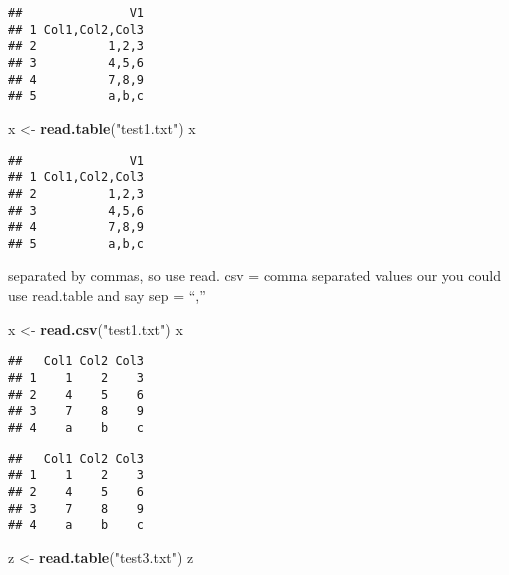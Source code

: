 \documentclass[]{article}
\newenvironment{Shaded}{\begin{snugshade}}{\end{snugshade}}
\newcommand{\DataTypeTok}[1]{\textcolor[rgb]{0.13,0.29,0.53}{#1}}
\newcommand{\KeywordTok}[1]{\textcolor[rgb]{0.13,0.29,0.53}{\textbf{#1}}}
\newcommand{\NormalTok}[1]{#1}
\newcommand{\OtherTok}[1]{\textcolor[rgb]{0.56,0.35,0.01}{#1}}
\newcommand{\StringTok}[1]{\textcolor[rgb]{0.31,0.60,0.02}{#1}}
\begin{document}
\begin{verbatim}
##               V1
## 1 Col1,Col2,Col3
## 2          1,2,3
## 3          4,5,6
## 4          7,8,9
## 5          a,b,c
\end{verbatim}

\begin{Shaded}
\begin{Highlighting}[]
\NormalTok{x <-}\StringTok{ }\KeywordTok{read.table}\NormalTok{(}\StringTok{"test1.txt"}\NormalTok{)}
\NormalTok{x}
\end{Highlighting}
\end{Shaded}

\begin{verbatim}
##               V1
## 1 Col1,Col2,Col3
## 2          1,2,3
## 3          4,5,6
## 4          7,8,9
## 5          a,b,c
\end{verbatim}

separated by commas, so use read. csv = comma separated values our you
could use read.table and say sep = ``,''

\begin{Shaded}
\begin{Highlighting}[]
\NormalTok{x <-}\StringTok{ }\KeywordTok{read.csv}\NormalTok{(}\StringTok{"test1.txt"}\NormalTok{)}
\NormalTok{x}
\end{Highlighting}
\end{Shaded}

\begin{verbatim}
##   Col1 Col2 Col3
## 1    1    2    3
## 2    4    5    6
## 3    7    8    9
## 4    a    b    c
\end{verbatim}

\begin{Shaded}
\end{Shaded}

\begin{verbatim}
##   Col1 Col2 Col3
## 1    1    2    3
## 2    4    5    6
## 3    7    8    9
## 4    a    b    c
\end{verbatim}

\begin{Shaded}
\begin{Highlighting}[]
\NormalTok{z <-}\StringTok{ }\KeywordTok{read.table}\NormalTok{(}\StringTok{"test3.txt"}\NormalTok{)}
\NormalTok{z}
\end{Highlighting}
\end{Shaded}
\end{document}
